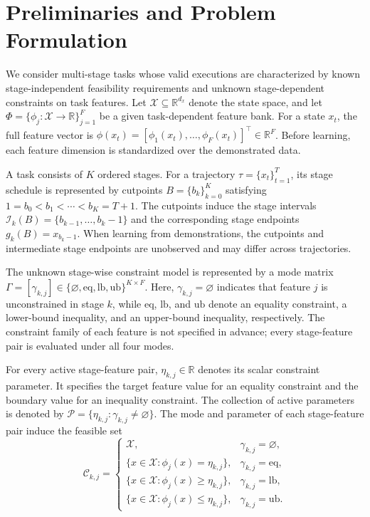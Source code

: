 \documentclass[lettersize,journal]{IEEEtran}
\begin{document}
\section{Preliminaries and Problem Formulation}
\label{sec:preliminaries}

We consider multi-stage tasks whose valid executions are characterized by known stage-independent feasibility requirements and unknown stage-dependent constraints on task features. Let $\mathcal{X}\subseteq\mathbb{R}^{d_x}$ denote the state space, and let $\Phi=\{\phi_j:\mathcal{X}\rightarrow\mathbb{R}\}_{j=1}^{F}$ be a given task-dependent feature bank. For a state $x_t$, the full feature vector is $\phi(x_t)=[\phi_1(x_t),\dots,\phi_F(x_t)]^\top\in\mathbb{R}^{F}$. Before learning, each feature dimension is standardized over the demonstrated data.

A task consists of $K$ ordered stages. For a trajectory $\tau=\{x_t\}_{t=1}^{T}$, its stage schedule is represented by cutpoints $B=\{b_k\}_{k=0}^{K}$ satisfying $1=b_0<b_1<\cdots<b_K=T+1$. The cutpoints induce the stage intervals $\mathcal{I}_k(B)=\{b_{k-1},\dots,b_k-1\}$ and the corresponding stage endpoints $g_k(B)=x_{b_k-1}$. When learning from demonstrations, the cutpoints and intermediate stage endpoints are unobserved and may differ across trajectories.

The unknown stage-wise constraint model is represented by a mode matrix $\Gamma=[\gamma_{k,j}]\in\{\varnothing,\mathrm{eq},\mathrm{lb},\mathrm{ub}\}^{K\times F}$. Here, $\gamma_{k,j}=\varnothing$ indicates that feature $j$ is unconstrained in stage $k$, while $\mathrm{eq}$, $\mathrm{lb}$, and $\mathrm{ub}$ denote an equality constraint, a lower-bound inequality, and an upper-bound inequality, respectively. The constraint family of each feature is not specified in advance; every stage-feature pair is evaluated under all four modes.

For every active stage-feature pair, $\eta_{k,j}\in\mathbb{R}$ denotes its scalar constraint parameter. It specifies the target feature value for an equality constraint and the boundary value for an inequality constraint. The collection of active parameters is denoted by $\mathcal{P}=\{\eta_{k,j}:\gamma_{k,j}\neq\varnothing\}$. The mode and parameter of each stage-feature pair induce the feasible set
\begin{equation}
\mathcal{C}_{k,j}
=
\begin{cases}
\mathcal{X},
& \gamma_{k,j}=\varnothing,\\
\{x\in\mathcal{X}:\phi_j(x)=\eta_{k,j}\},
& \gamma_{k,j}=\mathrm{eq},\\
\{x\in\mathcal{X}:\phi_j(x)\geq\eta_{k,j}\},
& \gamma_{k,j}=\mathrm{lb},\\
\{x\in\mathcal{X}:\phi_j(x)\leq\eta_{k,j}\},
& \gamma_{k,j}=\mathrm{ub}.
\end{cases}
\label{eq:stage_feature_feasible_set}
\end{equation}
\end{document}
